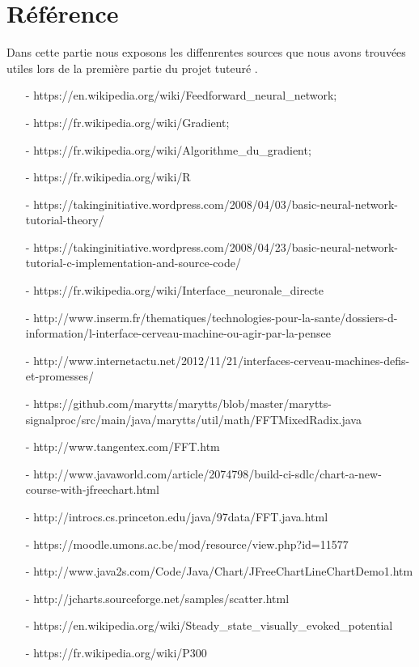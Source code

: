 \part*{Référence} %
\label{prt:référence_}
Dans cette partie nous exposons les diffenrentes sources que nous avons trouvées utiles lors de la première
partie du projet tuteuré .
\begin{itemize}
  	\item[-]https://en.wikipedia.org/wiki/Feedforward_neural_network;
  	\item[-]https://fr.wikipedia.org/wiki/Gradient;
  	\item[-]https://fr.wikipedia.org/wiki/Algorithme_du_gradient;
  	\item[-]https://fr.wikipedia.org/wiki/R%
  	\item[-]https://takinginitiative.wordpress.com/2008/04/03/basic-neural-network-tutorial-theory/
  	\item[-]https://takinginitiative.wordpress.com/2008/04/23/basic-neural-network-tutorial-c-implementation-and-source-code/
  	\item[-]https://fr.wikipedia.org/wiki/Interface_neuronale_directe
  	\item[-]http://www.inserm.fr/thematiques/technologies-pour-la-sante/dossiers-d-information/l-interface-cerveau-machine-ou-agir-par-la-pensee
  	\item[-]http://www.internetactu.net/2012/11/21/interfaces-cerveau-machines-defis-et-promesses/
  	\item[-]https://github.com/marytts/marytts/blob/master/marytts-signalproc/src/main/java/marytts/util/math/FFTMixedRadix.java
  	\item[-]http://www.tangentex.com/FFT.htm
  	\item[-]http://www.javaworld.com/article/2074798/build-ci-sdlc/chart-a-new-course-with-jfreechart.html
  	\item[-]http://introcs.cs.princeton.edu/java/97data/FFT.java.html
  	\item[-]https://moodle.umons.ac.be/mod/resource/view.php?id=11577
  	\item[-]http://www.java2s.com/Code/Java/Chart/JFreeChartLineChartDemo1.htm
  	\item[-]http://jcharts.sourceforge.net/samples/scatter.html
  	\item[-]https://en.wikipedia.org/wiki/Steady_state_visually_evoked_potential
  	\item[-]https://fr.wikipedia.org/wiki/P300
  \end{itemize}  
